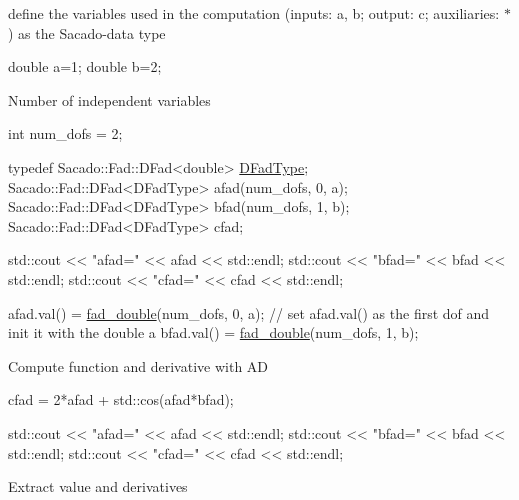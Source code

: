  define the variables used in the computation (inputs\+: a, b; output\+: c; auxiliaries\+: $\ast$) as the Sacado-\/data type 
\begin{DoxyCode}
\textcolor{keywordtype}{double} a=1;
\textcolor{keywordtype}{double} b=2;
\end{DoxyCode}
 Number of independent variables 
\begin{DoxyCode}
 \textcolor{keywordtype}{int} num\_dofs = 2;

\textcolor{keyword}{typedef} Sacado::Fad::DFad<double> \hyperlink{Sacado__Wrapper_8h_a7e0893207b87dad05c66a34baac8ed2e}{DFadType};
Sacado::Fad::DFad<DFadType> afad(num\_dofs, 0, a);
Sacado::Fad::DFad<DFadType> bfad(num\_dofs, 1, b);
Sacado::Fad::DFad<DFadType> cfad;

std::cout << \textcolor{stringliteral}{"afad="} << afad << std::endl;
std::cout << \textcolor{stringliteral}{"bfad="} << bfad << std::endl;
std::cout << \textcolor{stringliteral}{"cfad="} << cfad << std::endl;

afad.val() = \hyperlink{Sacado__example_8cc_a868b94676739e612d9c95940e70892a9}{fad\_double}(num\_dofs, 0, a); \textcolor{comment}{// set afad.val() as the first dof and init it with the
       double a}
bfad.val() = \hyperlink{Sacado__example_8cc_a868b94676739e612d9c95940e70892a9}{fad\_double}(num\_dofs, 1, b);
\end{DoxyCode}
 Compute function and derivative with AD 
\begin{DoxyCode}
cfad = 2*afad + std::cos(afad*bfad);

   std::cout << \textcolor{stringliteral}{"afad="} << afad << std::endl;
   std::cout << \textcolor{stringliteral}{"bfad="} << bfad << std::endl;
   std::cout << \textcolor{stringliteral}{"cfad="} << cfad << std::endl;
\end{DoxyCode}
 Extract value and derivatives 

